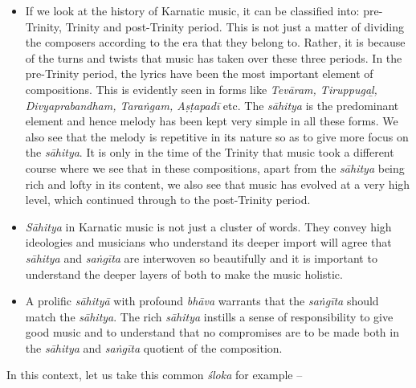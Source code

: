 \begin{itemize}
\itemsep=0pt

 \item If we look at the history of Karnatic music, it can be classified into: pre-Trinity, Trinity and post-Trinity period. This is not just a matter of dividing the composers according to the era that they belong to. Rather, it is because of the turns and twists that music has taken over these three periods. In the pre-Trinity period, the lyrics have been the most important element of compositions. This is evidently seen in forms like \textit{Tevāram, Tiruppugaḻ, Divyaprabandham, Taraṅgam, Aṣṭapadī} etc. The \textit{sāhitya} is the predominant element and hence melody has been kept very simple in all these forms. We also see that the melody is repetitive in its nature so as to give more focus on the \textit{sāhitya}. It is only in the time of the Trinity that music took a different course where we see that in these compositions, apart from the \textit{sāhitya} being rich and lofty in its content, we also see that music has evolved at a very high level, which continued through to the post-Trinity period.

 \item \textit{Sāhitya} in Karnatic music is not just a cluster of words. They convey high ideologies and musicians who understand its deeper import will agree that \textit{sāhitya} and \textit{saṅgīta} are interwoven so beautifully and it is important to understand the deeper layers of both to make the music holistic.

 \item A prolific \textit{sāhityā} with profound \textit{bhāva} warrants that the \textit{saṅgīta} should match the \textit{sāhitya}. The rich \textit{sāhitya} instills a sense of responsibility to give good music and to understand that no compromises are to be made both in the \textit{sāhitya} and \textit{saṅgīta} quotient of the composition.

\end{itemize}

In this context, let us take this common \textit{śloka} for example –


